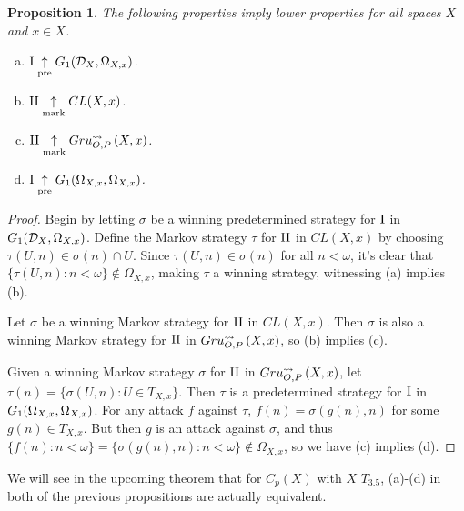 \documentclass{amsart}
\theoremstyle{plain}
\newtheorem{proposition}[theorem]{Proposition}
\theoremstyle{definition}
\theoremstyle{remark}
\theoremstyle{plain}
\theoremstyle{definition}
\theoremstyle{remark}
\begin{document}
\begin{proposition}\label{lowerPropB}
 The following properties imply lower properties for all spaces \(X\) and \(x\in X\).
 \begin{enumerate}[a)]
  \item \(\mathrm{I}\underset{\text{pre}}{\uparrow}G_{1}(\mathcal{D}_X,\Omega_{X,x})\).
  \item \(\mathrm{II}\underset{\text{mark}}{\uparrow} CL(X,x)\).
  \item \(\mathrm{II}\underset{\text{mark}}{\uparrow}Gru_{O,P}^{\leadsto}\left({X},{x}\right)\).
  \item \(\mathrm{I}\underset{\text{pre}}{\uparrow}G_{1}(\Omega_{X,x},\Omega_{X,x})\).
 \end{enumerate}
\end{proposition}
\begin{proof}
 Begin by letting \(\sigma\) be a winning predetermined strategy for \(\mathrm{I}\) in \(G_{1}(\mathcal{D}_X,\Omega_{X,x})\). 
 Define the Markov strategy \(\tau\) for \(\mathrm{II}\) in \(CL(X,x)\) by choosing \(\tau(U,n)\in\sigma(n)\cap U\). 
 Since \(\tau(U,n)\in\sigma(n)\) for all \(n<\omega\), it's clear that \(\{\tau(U,n):n<\omega\}\not\in\Omega_{X,x}\), making \(\tau\) a winning strategy, witnessing (a) implies (b).

 Let \(\sigma\) be a winning Markov strategy for \(\mathrm{II}\) in \(CL(X,x)\). Then \(\sigma\) is also a winning Markov strategy for \(\mathrm{II}\) in \(Gru_{O,P}^{\leadsto}\left({X},{x}\right)\), so (b) implies (c).

 Given a winning Markov strategy \(\sigma\) for \(\mathrm{II}\) in \(Gru_{O,P}^{\leadsto}\left({X},{x}\right)\), let \(\tau(n)=\{\sigma(U,n):U\in T_{X,x}\}\). 
 Then \(\tau\) is a predetermined strategy for \(\mathrm{I}\) in \(G_{1}(\Omega_{X,x},\Omega_{X,x})\). 
 For any attack \(f\) against \(\tau\), \(f(n)=\sigma(g(n),n)\) for some \(g(n)\in T_{X,x}\). 
 But then \(g\) is an attack against \(\sigma\), and thus \(\{f(n):n<\omega\}=\{\sigma(g(n),n):n<\omega\}\not\in\Omega_{X,x}\), so we have (c) implies (d).
\end{proof}

We will see in the upcoming theorem that for \(C_p(X)\) with \(X\) \(T_{3.5}\), (a)-(d) in both of the previous propositions are actually equivalent.
\end{document}

